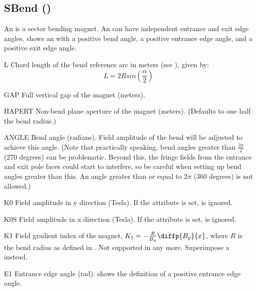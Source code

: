 

\subsection{SBend (\opalt)}
\label{ssec:SBend}
An  is a sector bending magnet. An  can have independent entrance and exit edge
angles.  shows an  with a positive bend angle, a positive entrance
edge angle, and a positive exit edge angle.

\begin{kdescription}
\item[L]
  Chord length of the bend reference arc in meters (see ), given by:
  \begin{equation*}
    L = 2 R sin\left(\frac{\alpha}{2}\right)
  \end{equation*}

\item[GAP]
  Full vertical gap of the magnet (meters).

\item[HAPERT]
  Non-bend plane aperture of the magnet (meters). (Defaults to one half the bend radius.)

\item[ANGLE]
  Bend angle (radians). Field amplitude of the bend will be adjusted to achieve this angle. (Note that practically
  speaking, bend angles greater than $\frac{3 \pi}{2}$ (270 degrees) can be problematic. Beyond this, the fringe
  fields from the entrance and exit pole faces could start to interfere, so be careful when setting up bend angles
  greater than this. An angle greater than or equal to $2 \pi$ (360 degrees) is not allowed.)

\item[K0]
  Field amplitude in y direction (Tesla). If the  attribute is set,  is ignored.

\item[K0S]
  Field amplitude in x direction (Tesla). If the  attribute is set,  is ignored.

\item[K1]
  Field gradient index of the magnet, $K_1=-\frac{R}{B_{y}}\diffp{B_y}{x}$, where
  $R$ is the bend radius as defined in . Not supported in \noopalt any more. Superimpose a  instead.

\item[E1]
  Entrance edge angle (\si{\radian}).  shows the definition of a positive entrance
  edge angle.


\end{kdescription}
